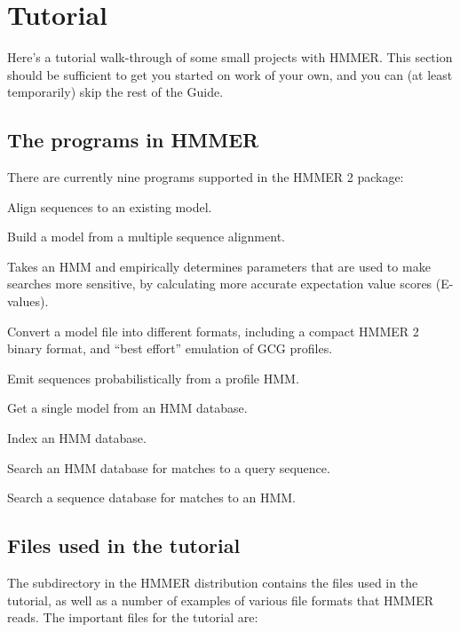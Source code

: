 \section{Tutorial}
\label{section:tutorial}

Here's a tutorial walk-through of some small projects with HMMER.
This section should be sufficient to get you started on work of your
own, and you can (at least temporarily) skip the rest of the Guide.

\subsection {The programs in HMMER}

There are currently nine programs supported in the HMMER 2 package:

\begin{wideitem}
\item[\emprog{hmmalign}] Align sequences to an existing model.
\item[\emprog{hmmbuild}] Build a model from a multiple sequence alignment.
\item[\emprog{hmmcalibrate}] Takes an HMM and empirically determines
parameters that are used to make searches more sensitive, by
calculating more accurate expectation value scores (E-values).
\item[\emprog{hmmconvert}] Convert a model file into different formats,
including a compact HMMER 2 binary format, and ``best effort''
emulation of GCG profiles.
\item[\emprog{hmmemit}] Emit sequences probabilistically from a profile HMM.
\item[\emprog{hmmfetch}] Get a single model from an HMM database.
\item[\emprog{hmmindex}] Index an HMM database.
\item[\emprog{hmmpfam}] Search an HMM database for matches to a query sequence.
\item[\emprog{hmmsearch}] Search a sequence database for matches to an HMM.
\end{wideitem}

\subsection{Files used in the tutorial}

The subdirectory  in the HMMER distribution contains the
files used in the tutorial, as well as a number of examples of various
file formats that HMMER reads. The important files for the tutorial
are:

